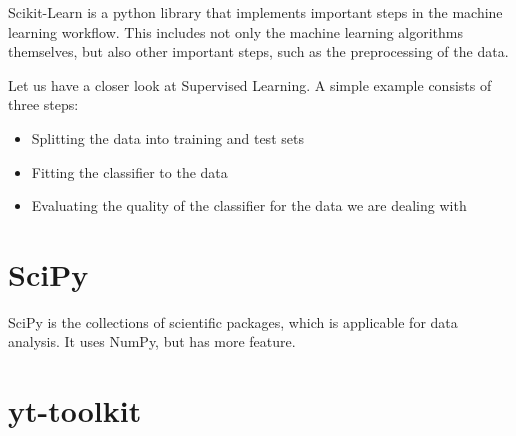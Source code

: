 \documentclass[10pt,a4paper]{article}
\begin{document}
Scikit-Learn is a python library that implements important steps in the machine learning workflow. This includes not only the machine learning algorithms themselves, but also other important steps, such as the preprocessing of the data.

Let us have a closer look at Supervised Learning. A simple example consists of three steps:
\begin{itemize}
\item Splitting the data into training and test sets
\item Fitting the classifier to the data
\item Evaluating the quality of the classifier for the data we are dealing with
\end{itemize}


















\section{SciPy}

SciPy is the collections of scientific packages, which is applicable for data analysis. It uses NumPy, but has more feature.




















\section{yt-toolkit}
\end{document}
